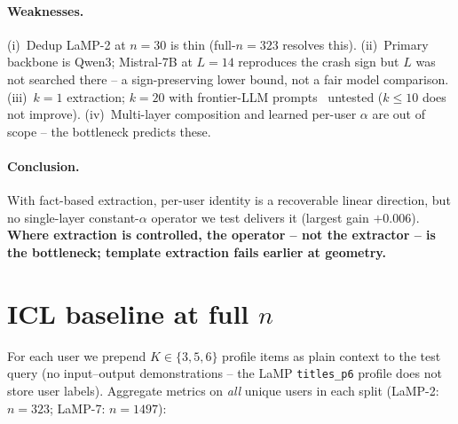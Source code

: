 \documentclass{article}
\begin{document}
\paragraph{Weaknesses.}
(i)~Dedup LaMP-2 at $n{=}30$ is thin (full-$n{=}323$ resolves this).
(ii)~Primary backbone is Qwen3; Mistral-7B at $L{=}14$ reproduces
the crash sign but $L$ was not searched there -- a sign-preserving
lower bound, not a fair model comparison.
(iii)~$k{=}1$ extraction; $k{=}20$ with frontier-LLM
prompts~\cite{chen2025persona} untested ($k\!\le\!10$ does not
improve).
(iv)~Multi-layer composition and learned per-user $\alpha$ are out
of scope -- the bottleneck predicts these.

\paragraph{Conclusion.}\label{sec:conclusion}
With fact-based extraction, per-user identity is a recoverable
linear direction, but no single-layer constant-$\alpha$ operator
we test delivers it (largest gain $+0.006$).  \textbf{Where
extraction is controlled, the operator -- not the extractor -- is
the bottleneck; template extraction fails earlier at geometry.}




\appendix
\onecolumn

\section{ICL baseline at full $n$}
\label{app:icl_vs_steering}
For each user we prepend $K\!\in\!\{3,5,6\}$ profile items as plain
context to the test query (no input--output demonstrations -- the
LaMP \texttt{titles\_p6} profile does not store user labels).
Aggregate metrics on \emph{all} unique users in each split (LaMP-2:
$n{=}323$; LaMP-7: $n{=}1497$):
\end{document}
